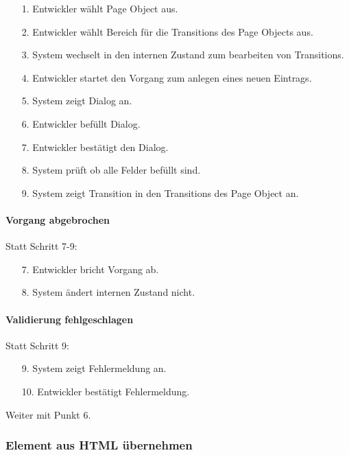 \begin{itemize}[itemsep=0pt]
\item[1.] Entwickler wählt Page Object aus.
\item[2.] Entwickler wählt Bereich für die Transitions des Page Objects aus. 
\item[3.] System wechselt in den internen Zustand zum bearbeiten von Transitions.
\item[4.] Entwickler startet den Vorgang zum anlegen eines neuen Eintrags.
\item[5.] System zeigt Dialog an. 
\item[6.] Entwickler befüllt Dialog.
\item[7.] Entwickler bestätigt den Dialog.
\item[8.] System prüft ob alle Felder befüllt sind.
\item[9.] System zeigt Transition in den Transitions des Page Object an.
\end{itemize}

\paragraph{Vorgang abgebrochen}
Statt Schritt 7-9:
\begin{itemize}[itemsep=0pt]
\item[7.] Entwickler bricht Vorgang ab. 
\item[8.] System ändert internen Zustand nicht. 
\end{itemize}

\paragraph{Validierung fehlgeschlagen}
Statt Schritt 9:
\begin{itemize}
\item[9.] System zeigt Fehlermeldung an. 
\item[10.] Entwickler bestätigt Fehlermeldung. 
\end{itemize}
Weiter mit Punkt 6. 


\subsubsection{Element aus HTML übernehmen}
\label{sec:element_from_html}

